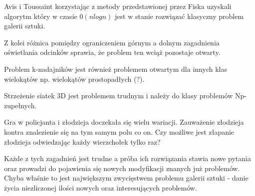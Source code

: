 \documentclass[brudnopis]{xmgr}
\theoremstyle{definition}
\begin{document}
Avis i Toussaint \cite{avis} korzystając z metody przedstawionej przez Fiska \cite{fisk} uzyskali algorytm który w czasie $0(n logn)$ jest w stanie rozwiązać klasyczny problem galerii sztuki.

Z kolei różnica pomiędzy ograniczeniem górnym a dolnym zagadnienia oświetlania odcinków sprawia, że problem ten wciąż pozostaje otwarty.

Problem k-nadajników jest również problemem otwartym dla innych klas wielokątów np. wielokątów prostopadłych (?).

Strzeżenie siatek 3D jest problemem trudnym i należy do klasy problemów Np-zupełnych.

Gra w policjanta i złodzieja doczekała się wielu wariacji. Zauważenie złodzieja kontra znalezienie się na tym samym polu co on. Czy możliwe jest złapanie złodzieja odwiedzając każdy wierzchołek tylko raz? 

Każde z tych zagadnień jest trudne a próba ich rozwiązania stawia nowe pytania oraz prowadzi do pojawienia się nowych modyfikacji znanych już problemów. Chyba właśnie to jest największym zwycięstwem problemu galerii sztuki - danie życia niezliczonej ilości nowych oraz interesujących problemów.

\appendix
\end{document}
